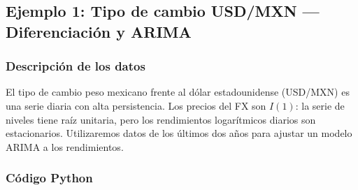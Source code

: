 \documentclass[12pt,a4paper]{article}
\begin{document}
\subsection{Ejemplo 1: Tipo de cambio USD/MXN --- Diferenciación y ARIMA}

\subsubsection{Descripción de los datos}

El tipo de cambio peso mexicano frente al dólar estadounidense (USD/MXN) es una serie
diaria con alta persistencia. Los precios del FX son $I(1)$: la serie de niveles tiene
raíz unitaria, pero los rendimientos logarítmicos diarios son estacionarios. Utilizaremos
datos de los últimos dos años para ajustar un modelo ARIMA a los rendimientos.

\subsubsection{Código Python}
\end{document}
